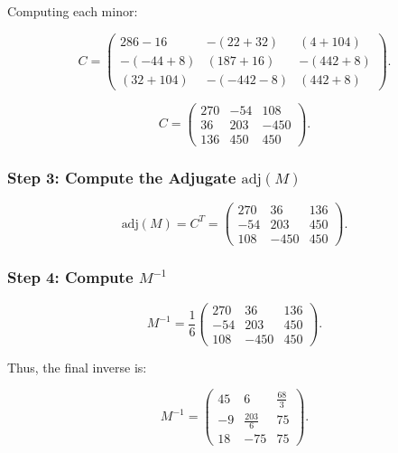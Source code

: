 \documentclass[12pt]{article}
\begin{document}
Computing each minor:

\[
C =
\begin{pmatrix}
286 - 16 & -(22 + 32) & (4 + 104) \\
-(-44 + 8) & (187 + 16) & -(442 + 8) \\
(32 + 104) & -(-442 - 8) & (442 + 8)
\end{pmatrix}.
\]

\[
C =
\begin{pmatrix}
270 & -54 & 108 \\
36 & 203 & -450 \\
136 & 450 & 450
\end{pmatrix}.
\]

\subsubsection*{Step 3: Compute the Adjugate \( \text{adj}(M) \)}

\[
\text{adj}(M) = C^T =
\begin{pmatrix}
270 & 36 & 136 \\
-54 & 203 & 450 \\
108 & -450 & 450
\end{pmatrix}.
\]

\subsubsection*{Step 4: Compute \( M^{-1} \)}

\[
M^{-1} = \frac{1}{6}
\begin{pmatrix}
270 & 36 & 136 \\
-54 & 203 & 450 \\
108 & -450 & 450
\end{pmatrix}.
\]

Thus, the final inverse is:

\[
M^{-1} =
\begin{pmatrix}
45 & 6 & \frac{68}{3} \\
-9 & \frac{203}{6} & 75 \\
18 & -75 & 75
\end{pmatrix}.
\]
\end{document}
